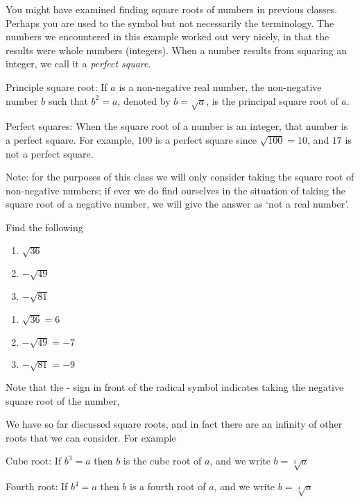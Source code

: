 You might have examined finding square roots of numbers in previous classes. Perhaps you
are used to the symbol but not necessarily the terminology. The numbers we encountered
in this example worked out very nicely, in that the results were whole numbers (integers). When
a number results from squaring an integer, we call it a {\em perfect square}. 

\begin{myDefinition}
	Principle square root: If $a$ is a non-negative real number, the non-negative number $b$ such that $b^2=a$, denoted
	by $b=\sqrt{a}$, is the principal square root of $a$. 
				
	Perfect squares: When the square root of a number is an integer, that number is a perfect square. For example, 
	100 is a perfect square since $\sqrt{100}=10$, and $17$ is not a perfect square.
\end{myDefinition}

Note: for the purposes of this class we will only consider taking the square root of non-negative numbers; if 
ever we do find ourselves in the situation of taking the square root of a negative number, we will give the answer
as `not a real number'.

\begin{myexample}
Find the following
\begin{multicols}{3}
	\begin{enumerate}
		\item $\sqrt{36}$
		\item $-\sqrt{49}$
		\item $-\sqrt{81}$
	\end{enumerate} 
\end{multicols}
\end{myexample}
\begin{myProof}
	\begin{enumerate}
		\item $\sqrt{36}=6$
		\item $-\sqrt{49}=-7$
		\item $-\sqrt{81}=-9$
	\end{enumerate} 
\end{myProof}
Note that the - sign in front of the radical symbol indicates taking the negative square root of the number,

We have so far discussed square roots, and in fact there are an infinity of other roots that we can consider. For example
\begin{myDefinition}
	Cube root: If $b^3=a$ then $b$ is the cube root of $a$, and we write $b=\sqrt[3]{a}$
					
	Fourth root: If $b^4=a$ then $b$ is a fourth root of $a$, and we write $b=\sqrt[4]{a}$
\end{myDefinition}



